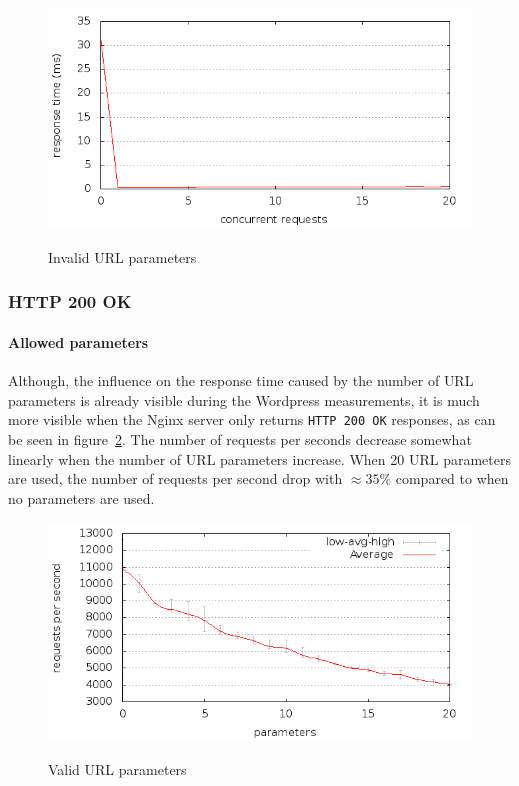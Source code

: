 \documentclass[Experiments]{subfiles}
\begin{document}
\begin{figure}[H]
\caption{Invalid URL parameters}
\centering
\includegraphics[scale=0.55] {images/results/wp_with_naxsi_incremented_disallowed_parameters/output.png}
\label{fig:Invalid parameters}
\end{figure}

\subsubsection{HTTP 200 OK}

\paragraph{Allowed parameters}
Although, the influence on the response time caused by the number of \ac{URL} parameters is already visible during the Wordpress measurements, it is much more visible when the Nginx server only returns  \verb+HTTP 200 OK+ responses, as can be seen in figure~\ref{fig:HTTP 200 OK: valid url parameters}. The number of requests per seconds decrease somewhat linearly when the number of \ac{URL} parameters increase. When 20 \ac{URL} parameters are used, the number of requests per second drop with $\approx 35\%$ compared to when no parameters are used.

\begin{figure}[H]
\caption{Valid URL parameters}
\centering
\includegraphics[scale=0.55] {images/results/200_with_naxsi_incremented_allowed_parameters/output.png}
\label{fig:HTTP 200 OK: valid url parameters}
\end{figure}
\end{document}

